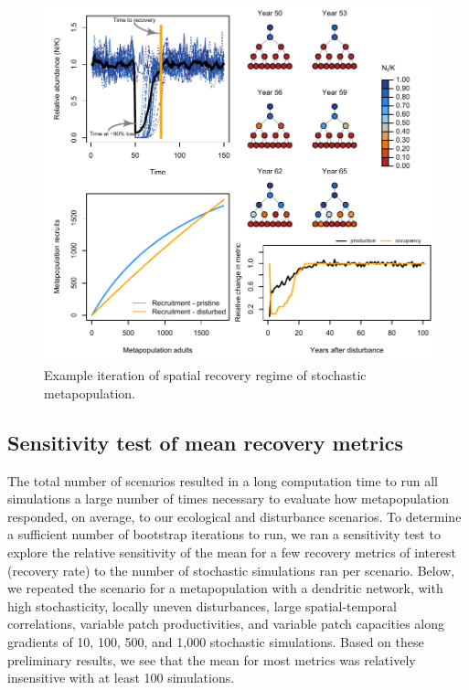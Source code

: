 \documentclass[
]{article}
\begin{document}
\begin{figure}[H]

{\centering \includegraphics{Managing_for_ecological_surprises_in_metapopulations_files/figure-latex/example results4-1} 

}

\caption{Example iteration of spatial recovery regime of stochastic metapopulation.}\label{fig:example results4}
\end{figure}
\newpage

\hypertarget{sensitivity-test-of-mean-recovery-metrics}{%
\subsection{Sensitivity test of mean recovery
metrics}\label{sensitivity-test-of-mean-recovery-metrics}}

The total number of scenarios resulted in a long computation time to run
all simulations a large number of times necessary to evaluate how
metapopulation responded, on average, to our ecological and disturbance
scenarios. To determine a sufficient number of bootstrap iterations to
run, we ran a sensitivity test to explore the relative sensitivity of
the mean for a few recovery metrics of interest (recovery rate) to the
number of stochastic simulations ran per scenario. Below, we repeated
the scenario for a metapopulation with a dendritic network, with high
stochasticity, locally uneven disturbances, large spatial-temporal
correlations, variable patch productivities, and variable patch
capacities along gradients of 10, 100, 500, and 1,000 stochastic
simulations. Based on these preliminary results, we see that the mean
for most metrics was relatively insensitive with at least 100
simulations.
\end{document}
